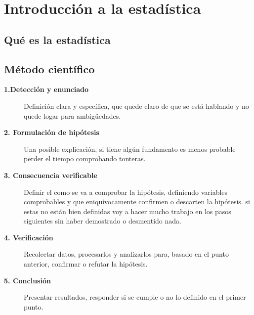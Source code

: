 \documentclass[letterpaper,10pt,openany,oneside]{sphinxmanual}
\begin{document}
\chapter{Introducción a la estadística}
\label{Estadistica::doc}\label{Estadistica:introduccion-a-la-estadistica}

\section{Qué es la estadística}
\label{Estadistica:que-es-la-estadistica}

\section{Método científico}
\label{Estadistica:metodo-cientifico}\begin{description}
\item[{\textbf{1.Detección y enunciado}}] \leavevmode
Definición clara y específica, que quede claro de que se está hablando y no quede logar
para ambigüedades.

\item[{\textbf{2. Formulación de hipótesis}}] \leavevmode
Una posible explicación, si tiene algún fundamento es menos probable perder el tiempo
comprobando tonteras.

\item[{\textbf{3. Consecuencia verificable}}] \leavevmode
Definir el como se va a comprobar la hipótesis, definiendo variables comprobables y que
eniquívocamente confirmen o descarten la hipótesis. si estas no están bien definidas voy
a hacer mucho trabajo en los pasos siguientes sin haber demostrado o desmentido nada.

\item[{\textbf{4. Verificación}}] \leavevmode
Recolectar datos, procesarlos y analizarlos para, basado en el punto anterior, confirmar
o refutar la hipótesis.

\item[{\textbf{5. Conclusión}}] \leavevmode
Presentar resultados, responder si se cumple o no lo definido en el primer punto.

\end{description}
\end{document}
